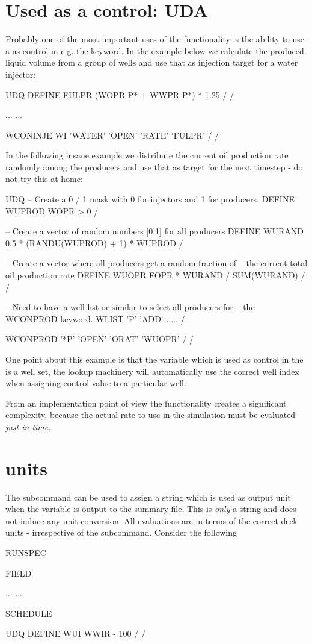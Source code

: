 \section{Used as a control: UDA}
\label{uda}
Probably one of the most important uses of the \udq{} functionality is the
ability to use a \udq{} as control in e.g. the  keyword. In the
example below we calculate the produced liquid volume from a group of wells and
use that as injection target for a water injector:

\begin{deck}
UDQ
  DEFINE FULPR  (WOPR P* + WWPR P*) * 1.25 /
/

...
...

WCONINJE
  WI  'WATER'  'OPEN'  'RATE'   'FULPR' /
/
\end{deck}

In the following insane example we distribute the current oil production rate
randomly among the producers and use that as target for the next timestep - do
not try this at home:
\begin{deck}
UDQ
  -- Create a 0 / 1 mask with 0 for injectors and 1 for producers.
  DEFINE WUPROD WOPR > 0 /
  
  -- Create a vector of random numbers [0,1] for all producers
  DEFINE WURAND 0.5 * (RANDU(WUPROD) + 1) * WUPROD /

  -- Create a vector where all producers get a random fraction of
  -- the current total oil production rate
  DEFINE WUOPR FOPR * WURAND / SUM(WURAND) /
/

-- Need to have a well list or similar to select all producers for 
-- the WCONPROD keyword.
WLIST
  'P' 'ADD' ..... /


WCONPROD
 '*P' 'OPEN' 'ORAT'  'WUOPR' /
/
\end{deck}
One point about this example is that the \udq{} variable  which is
used as control in the  is a well set, the lookup machinery will
automatically use the correct well index when assigning control value to a
particular well.

From an implementation point of view the  functionality creates a
significant complexity, because the actual rate to use in the simulation must be
evaluated \emph{just in time}.

\section{\udq{} units}
\label{udq_units}
The \udq{} subcommand  can be used to assign a string which is used as
output unit when the \udq{} variable is output to the summary file. This is
\emph{only} a string and does not induce any unit conversion. All \udq{}
evaluations are in terms of the correct deck units - irrespective of the 
subcommand. Consider the following
\begin{deck}
RUNSPEC

FIELD

...
...

SCHEDULE

UDQ
  DEFINE WUI WWIR - 100 /
/
\end{deck}

